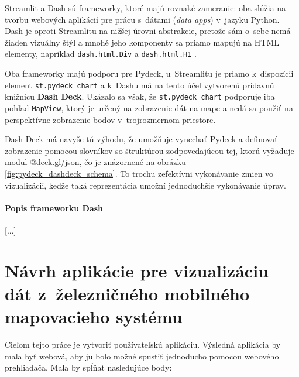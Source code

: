 Streamlit a Dash sú frameworky, ktoré majú rovnaké zameranie: oba slúžia na tvorbu webových aplikácií pre prácu s~dátami (\emph{data apps}) v~jazyku Python. Dash je oproti Streamlitu na nižšej úrovni abstrakcie, pretože sám o~sebe nemá žiaden vizuálny štýl a mnohé jeho komponenty sa priamo mapujú na HTML elementy, napríklad \texttt{dash.html.Div} a \texttt{dash.html.H1} \cite{streamlit_documentation}\cite{dash_documentation}.

Oba frameworky majú podporu pre Pydeck, u~Streamlitu je priamo k~dispozícii element \texttt{st.pydeck\_chart} a k~Dashu má na tento účel vytvorenú prídavnú knižnicu \textbf{Dash Deck}. Ukázalo sa však, že \texttt{st.pydeck\_chart} podporuje iba pohľad \texttt{MapView}, ktorý je určený na zobrazenie dát na mape a nedá sa použiť na perspektívne zobrazenie bodov v~trojrozmernom priestore.

Dash Deck má navyše tú výhodu, že umožňuje vynechať Pydeck a definovať zobrazenie pomocou slovníkov so štruktúrou zodpovedajúcou tej, ktorú vyžaduje modul @deck.gl/json, čo je znázornené na obrázku \ref{fig:pydeck_dashdeck_schema}. To trochu zefektívni vykonávanie zmien vo vizualizácii, keďže taká reprezentácia umožní jednoduchšie vykonávanie úprav.

\subsubsection{Popis frameworku Dash}

[...]

\chapter{Návrh aplikácie pre vizualizáciu dát z~železničného mobilného mapovacieho systému}

Cieľom tejto práce je vytvoriť používateľskú aplikáciu. Výsledná aplikácia by mala byť webová, aby ju bolo možné spustiť jednoducho pomocou webového prehliadača. Mala by spĺňať nasledujúce body:

